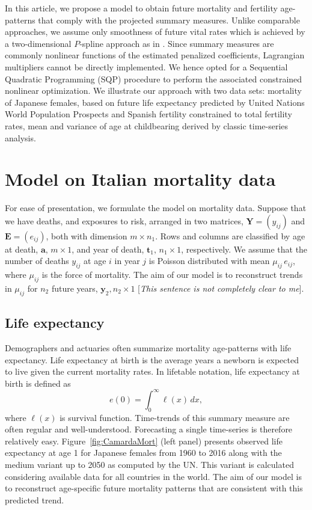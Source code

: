 \documentclass[a4paper,twoside, openright, 12pt, leqno]{article}
\begin{document}
In this article, we propose a model to obtain future mortality and fertility age-patterns that comply with the projected summary measures. Unlike comparable approaches, we assume only smoothness of future vital rates which is achieved by a two-dimensional $P$-spline approach as in \citet{currie2004smoothing}. Since summary measures are commonly nonlinear functions of the estimated penalized coefficients, Lagrangian multipliers cannot be directly implemented. We hence opted for a Sequential Quadratic Programming (SQP) procedure \citep{nocedal2006sequential} to perform the associated constrained nonlinear optimization. We illustrate our approach with two data sets: mortality of Japanese females, based on future life expectancy predicted by United Nations World Population Prospects \citep{UN2017} and Spanish fertility constrained to total fertility rates, mean and variance of age at childbearing derived by classic time-series analysis.


\section{Model on Italian mortality data}

For ease of presentation, we formulate the model on mortality data. Suppose that we have deaths, and exposures to risk, arranged in two matrices, 
$\bm{Y} = (y_{ij})$ and $\bm{E} = (e_{ij})$, both with dimension $m \times n_{1}$.  Rows and columns are classified by age at death, $\bm{a}, \,m \times 1$, and year of death, $\bm{t}_{1}, \,n_{1} \times 1$, respectively.  
We assume that the number of deaths $y_{ij}$ at age $i$ in year $j$ is Poisson distributed with mean $\mu_{ij} \,e_{ij}$, where $\mu_{ij}$ is the force of mortality. 
The aim of our model is to reconstruct trends in $\mu_{ij}$ for  $n_{2}$ future years, $\bm{y}_{2}, n_{2} \times 1$ [\textit{This sentence is not completely clear to me}].

\subsection{Life expectancy}

Demographers and actuaries often summarize mortality age-patterns with life expectancy. Life expectancy at birth is the average years a newborn is expected to live given the current mortality rates. In lifetable notation, life expectancy at birth is defined as
\begin{equation*}\label{eq:ex}
e(0)=\int_0^\infty\ell(x)\,dx,
\end{equation*}
where $\ell(x)$ is survival function. Time-trends of this summary measure are often regular and well-understood. Forecasting a single time-series is therefore relatively easy. Figure~\ref{fig:CamardaMort} (left panel) presents observed life expectancy at age 1 for Japanese females from 1960 to 2016 along with the medium variant up to 2050 as computed by the UN. This variant is calculated considering available data for all countries in the world.  The aim of our model is to reconstruct age-specific future mortality patterns that are consistent with this predicted trend.
\end{document}
